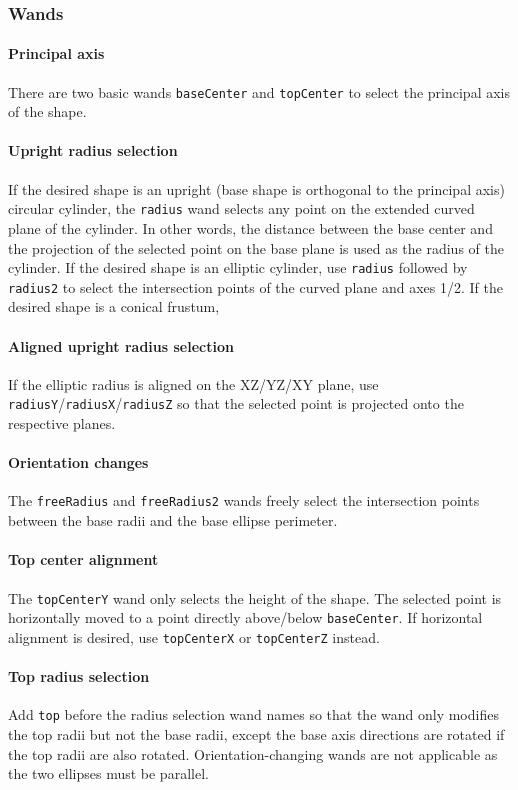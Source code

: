 \documentclass{report}
\begin{document}
				\subsubsection{Wands}
					\paragraph{Principal axis} There are two basic wands \texttt{baseCenter} and \texttt{topCenter} to
					select the principal axis of the shape.
					\paragraph{Upright radius selection} If the desired shape is an upright (base shape is orthogonal
					to the principal axis) circular cylinder, the \texttt{radius} wand selects any point on the
					extended curved plane of the cylinder. In other words, the distance between the base center and the
					projection of the selected point on the base plane is used as the radius of the cylinder. If the
					desired shape is an elliptic cylinder, use \texttt{radius} followed by \texttt{radius2} to select
					the intersection points of the curved plane and axes 1/2. If the desired shape is a conical
					frustum,
					\paragraph{Aligned upright radius selection} If the elliptic radius is aligned on the XZ/YZ/XY
					plane, use \texttt{radiusY}/\texttt{radiusX}/\texttt{radiusZ} so that the selected point is
					projected onto the respective planes.
					\paragraph{Orientation changes} The \texttt{freeRadius} and \texttt{freeRadius2} wands freely
					select the intersection points between the base radii and the base ellipse perimeter.
					\paragraph{Top center alignment} The \texttt{topCenterY} wand only selects the height of the shape.
					The selected point is horizontally moved to a point directly above/below \texttt{baseCenter}. If
					horizontal alignment is desired, use \texttt{topCenterX} or \texttt{topCenterZ} instead.
					\paragraph{Top radius selection} Add \texttt{top} before the radius selection wand names so that
					the wand only modifies the top radii but not the base radii, except the base axis directions are
					rotated if the top radii are also rotated. Orientation-changing wands are not applicable as the two
					ellipses must be parallel.
\end{document}
